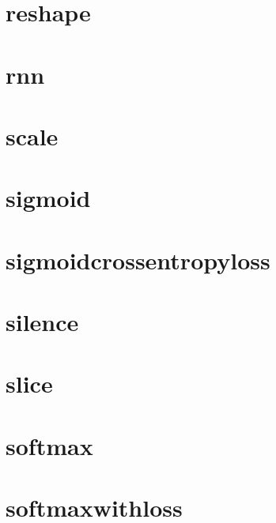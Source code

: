 \documentclass[twoside]{book}
\newcommand{\+}{\discretionary{\mbox{\scriptsize$\hookleftarrow$}}{}{}}
\begin{document}
\chapter{reshape}
\label{md_docs_tutorial_layers_reshape}

\chapter{rnn}
\label{md_docs_tutorial_layers_rnn}

\chapter{scale}
\label{md_docs_tutorial_layers_scale}

\chapter{sigmoid}
\label{md_docs_tutorial_layers_sigmoid}

\chapter{sigmoidcrossentropyloss}
\label{md_docs_tutorial_layers_sigmoidcrossentropyloss}

\chapter{silence}
\label{md_docs_tutorial_layers_silence}

\chapter{slice}
\label{md_docs_tutorial_layers_slice}

\chapter{softmax}
\label{md_docs_tutorial_layers_softmax}

\chapter{softmaxwithloss}
\label{md_docs_tutorial_layers_softmaxwithloss}

\end{document}
